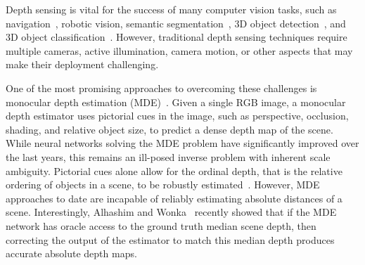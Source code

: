 
Depth sensing is vital for the success of many computer vision tasks, such as navigation~\cite{geiger2013vision}, robotic vision, semantic segmentation~\cite{ren2012rgb,silberman2012indoor,gupta2013perceptual}, 3D object detection~\cite{shrivastava2013building,lin2013holistic,gupta2014learning,song2014sliding,song2016deep}, and 3D object classification~\cite{wu20153d,maturana2015voxnet,qi2016volumetric}. However, traditional depth sensing techniques require multiple cameras, active illumination, camera motion, or other aspects that may make their deployment challenging.

One of the most promising approaches to overcoming these challenges is monocular depth estimation (MDE)~\cite{Saxena2006,Eigen2014,Laina2016,Fu2018,Alhashim2018}. Given a single RGB image, a monocular depth estimator uses pictorial cues in the image, such as perspective, occlusion, shading, and relative object size, to predict a dense depth map of the scene. While neural networks solving the MDE problem have significantly improved over the last years, this remains an ill-posed inverse problem with inherent scale ambiguity. Pictorial cues alone allow for the ordinal depth, that is the relative ordering of objects in a scene, to be robustly estimated~\cite{Eigen2014,Fu2018}. However, MDE approaches to date are incapable of reliably estimating absolute distances of a scene. Interestingly, Alhashim and Wonka~\cite{Alhashim2018} recently showed that if the MDE network has oracle access to the ground truth median scene depth, then correcting the output of the estimator to match this median depth produces accurate absolute depth maps.



